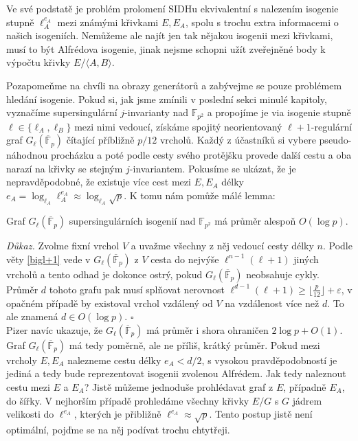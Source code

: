 \documentclass[12pt]{report}
\begin{document}
Ve své podstatě je problém prolomení SIDHu ekvivalentní s nalezením isogenie stupně $\ell_A ^{e_A}$ mezi známými křivkami $E,E_A$, spolu s trochu extra informacemi o našich isogeniích. Nemůžeme ale najít jen tak nějakou isogenii mezi křivkami, musí to být Alfrédova isogenie, jinak nejsme schopni užít zveřejněné body k výpočtu křivky $E/\langle A,B \rangle$.

Pozapomeňme na chvíli na obrazy generátorů a zabývejme se pouze problémem hledání isogenie. Pokud si, jak jsme zmínili v poslední sekci minulé kapitoly, vyznačíme supersingulární $j$-invarianty nad $\mathbb{F}_{p^2}$ a propojíme je via isogenie stupně $\ell \in \lbrace \ell_A, \ell_B \rbrace$  mezi nimi vedoucí, získáme spojitý neorientovaný $\ell+1$-regulární graf $G_{\ell} (\overline{\mathbb{F}}_p)$ čítající příbližně $p/12$ vrcholů. Každý z účastníků si vybere pseudo-náhodnou procházku a poté podle cesty svého protějšku provede další cestu a oba narazí na křivky se stejným $j$-invariantem. Pokusíme se ukázat, že je nepravděpodobné, že existuje více cest mezi $E,E_A$ délky $e_A = \log_{\ell_A} \ell_A ^{e_A} \approx \log_{\ell_A} \sqrt{p}$. K tomu nám pomůže málé lemma:

\begin{lemma*}
Graf $G_{\ell} (\overline{\mathbb{F}}_p)$ supersingulárních isogenií nad $\mathbb{F}_{p^2}$ má průměr alespoň $O(\log p)$.
\end{lemma*}
\noindent \textit{Důkaz.} Zvolme fixní vrchol $V$ a uvažme všechny z něj vedoucí cesty délky $n$. Podle věty \ref{bigl+1} vede v $G_{\ell} (\overline{\mathbb{F}}_p)$ z $V$ cesta do nejvýše $\ell^{n-1} (\ell+1)$ jiných vrcholů a tento odhad je dokonce ostrý, pokud $G_{\ell} (\overline{\mathbb{F}}_p)$ neobsahuje cykly. Průměr $d$ tohoto grafu pak musí splňovat nerovnost $\ell^{d-1} (\ell+1) \geqslant \lfloor \frac{p}{12} \rfloor + \varepsilon$, v opačném případě by existoval vrchol vzdálený od $V$ na vzdálenost více než $d$. To ale znamená $d \in O(\log p)$. \hfill $\square$\\

Pizer \cite[Thm. 1.]{Pizer} navíc ukazuje, že $G_{\ell} (\overline{\mathbb{F}}_p)$ má průměr i shora ohraničen $2 \log p + O(1)$. Graf $G_{\ell} (\overline{\mathbb{F}}_p)$ má tedy poměrně, ale ne příliš,  krátký průměr. Pokud mezi vrcholy $E,E_A$ nalezneme cestu délky $e_A < d/2$, s vysokou pravděpodobností je jediná a tedy bude reprezentovat isogenii zvolenou Alfrédem. Jak tedy naleznout cestu mezi $E$ a $E_A$? Jistě můžeme jednoduše prohlédavat graf z $E$, případně $E_A$, do šířky. V nejhorším případě prohledáme všechny křivky $E/G$ s $G$ jádrem velikosti do $\ell^{e_A}$, kterých je přibližně $\ell^{e_A} \approx \sqrt{p}$. Tento postup jistě není optimální, pojďme se na něj podívat trochu chtytřeji.
\end{document}
